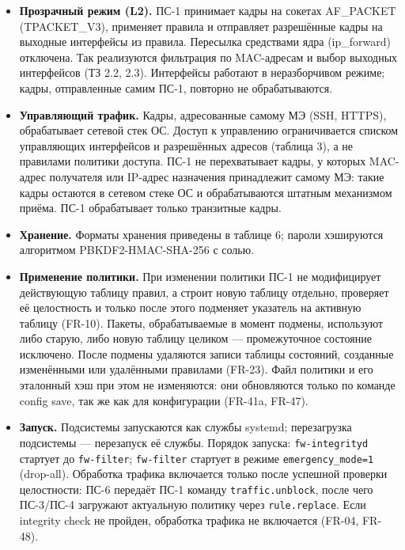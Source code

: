 \documentclass[13pt,a4paper,final]{article}
\begin{document}
	\begin{itemize}
		\item \textbf{Прозрачный режим (L2).} ПС-1 принимает кадры на сокетах AF\_PACKET (TPACKET\_V3), применяет правила и отправляет разрешённые кадры на выходные интерфейсы из правила. Пересылка средствами ядра (ip\_forward) отключена. Так реализуются фильтрация по MAC-адресам и выбор выходных интерфейсов (ТЗ 2.2, 2.3). Интерфейсы работают в неразборчивом режиме; кадры, отправленные самим ПС-1, повторно не обрабатываются.
		
		\item \textbf{Управляющий трафик.} Кадры, адресованные самому МЭ (SSH, HTTPS), обрабатывает сетевой стек ОС. Доступ к управлению ограничивается списком управляющих интерфейсов и разрешённых адресов (таблица 3), а не правилами политики доступа. {ПС-1 не перехватывает кадры, у которых MAC-адрес получателя или IP-адрес назначения принадлежит самому МЭ: такие кадры остаются в сетевом стеке ОС и обрабатываются штатным механизмом приёма. ПС-1 обрабатывает только транзитные кадры.}
		
		
		\item \textbf{Хранение.} Форматы хранения приведены в таблице 6; пароли хэшируются алгоритмом PBKDF2-HMAC-SHA-256 с солью.
		
		\item \textbf{Применение политики.} При изменении политики ПС-1 не модифицирует действующую таблицу правил, а строит новую таблицу отдельно, проверяет её целостность и только после этого  подменяет указатель на активную таблицу (FR-10). Пакеты, обрабатываемые в момент подмены, используют либо старую, либо новую таблицу целиком — промежуточное состояние исключено. После подмены удаляются записи таблицы состояний, созданные изменёнными или удалёнными правилами (FR-23). Файл политики и его эталонный хэш при этом не изменяются: они обновляются только по команде config save, так же как для конфигурации (FR-41a, FR-47).
		
		\item \textbf{Запуск.} Подсистемы запускаются как службы systemd; перезагрузка подсистемы — перезапуск её службы. {Порядок запуска: \texttt{fw-integrityd} стартует до \texttt{fw-filter}; \texttt{fw-filter} стартует в режиме \texttt{emergency\_mode=1} (drop-all). Обработка трафика включается только после успешной проверки целостности: ПС-6 передаёт ПС-1 команду \texttt{traffic.unblock}, после чего ПС-3/ПС-4 загружают актуальную политику через \texttt{rule.replace}. Если integrity check не пройден, обработка трафика не включается (FR-04, FR-48).}
		

\end{itemize}
\end{document}

